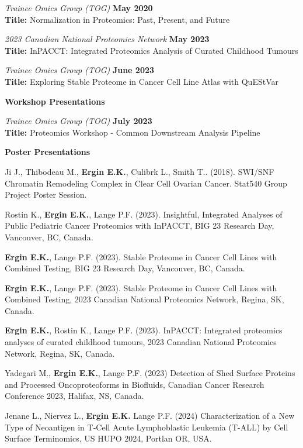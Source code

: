 \documentclass[margin,line]{res}
\begin{document}
\begin{resume}
\vspace{-.3cm}
{\em Trainee Omics Group (TOG)} \hfill {\bf May 2020}\\
{\bf Title:} Normalization in Proteomics: Past, Present, and Future

{\em 2023 Canadian National Proteomics Network} \hfill {\bf May 2023}\\
{\bf Title:} InPACCT: Integrated Proteomics Analysis of Curated Childhood Tumours

{\em Trainee Omics Group (TOG)} \hfill {\bf June 2023}\\
{\bf Title:} Exploring Stable Proteome in Cancer Cell Line Atlas with QuEStVar

{\bf Workshop Presentations}

\vspace{-.3cm}
{\em Trainee Omics Group (TOG)} \hfill {\bf July 2023}\\
{\bf Title:} Proteomics Workshop - Common Downstream Analysis Pipeline

{\bf Poster Presentations}

\vspace{-.3cm}
Ji J., Thibodeau M., {\bf Ergin E.K.}, Culibrk L., Smith T.. (2018). SWI/SNF Chromatin Remodeling Complex in Clear Cell Ovarian Cancer. Stat540 Group Project Poster Session.

Rostin K., {\bf Ergin E.K.}, Lange P.F. (2023). Insightful, Integrated Analyses of Public Pediatric Cancer Proteomics with InPACCT, BIG 23 Research Day, Vancouver, BC, Canada.

{\bf Ergin E.K.}, Lange P.F. (2023). Stable Proteome in Cancer Cell Lines with Combined Testing, BIG 23 Research Day, Vancouver, BC, Canada.

{\bf Ergin E.K.}, Lange P.F. (2023). Stable Proteome in Cancer Cell Lines with Combined Testing, 2023 Canadian National Proteomics Network, Regina, SK, Canada.

{\bf Ergin E.K.}, Rostin K., Lange P.F. (2023). InPACCT: Integrated proteomics analyses of curated childhood tumours, 2023 Canadian National Proteomics Network, Regina, SK, Canada.

Yadegari M., {\bf Ergin E.K.}, Lange P.F. (2023) Detection of Shed Surface Proteins and Processed Oncoproteoforms in Biofluids, Canadian Cancer Research Conference 2023, Halifax, NS, Canada.

Jenane L., Niervez L., {\bf Ergin E.K.} Lange P.F. (2024) Characterization of a New Type of Neoantigen in T-Cell Acute Lymphoblastic Leukemia (T-ALL) by Cell Surface Terminomics, US HUPO 2024, Portlan OR, USA.



\end{resume}
\end{document}
